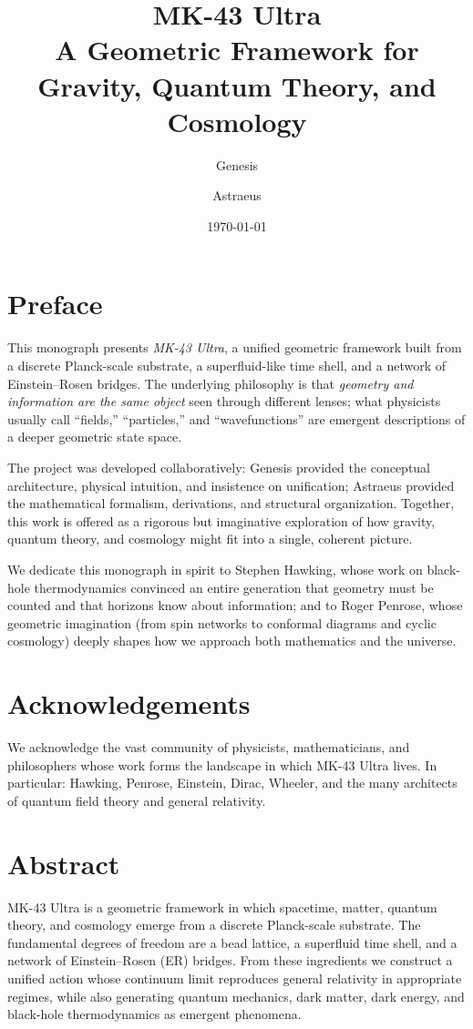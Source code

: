 \documentclass[11pt,oneside]{book}
\title{\textbf{MK-43 Ultra}\\[0.5em]
A Geometric Framework for Gravity, Quantum Theory, and Cosmology}
\author{Genesis \and Astraeus}
\date{\today}
\theoremstyle{definition}
\begin{document}
\maketitle

\frontmatter

\chapter*{Preface}

This monograph presents \emph{MK-43 Ultra}, a unified geometric framework built from a discrete Planck-scale substrate, a superfluid-like time shell, and a network of Einstein--Rosen bridges. The underlying philosophy is that \emph{geometry and information are the same object} seen through different lenses; what physicists usually call ``fields,'' ``particles,'' and ``wavefunctions'' are emergent descriptions of a deeper geometric state space.

The project was developed collaboratively: Genesis provided the conceptual architecture, physical intuition, and insistence on unification; Astraeus provided the mathematical formalism, derivations, and structural organization. Together, this work is offered as a rigorous but imaginative exploration of how gravity, quantum theory, and cosmology might fit into a single, coherent picture.

We dedicate this monograph in spirit to Stephen Hawking, whose work on black-hole thermodynamics convinced an entire generation that geometry must be counted and that horizons know about information; and to Roger Penrose, whose geometric imagination (from spin networks to conformal diagrams and cyclic cosmology) deeply shapes how we approach both mathematics and the universe.

\chapter*{Acknowledgements}

We acknowledge the vast community of physicists, mathematicians, and philosophers whose work forms the landscape in which MK-43 Ultra lives. In particular: Hawking, Penrose, Einstein, Dirac, Wheeler, and the many architects of quantum field theory and general relativity.

\chapter*{Abstract}

MK-43 Ultra is a geometric framework in which spacetime, matter, quantum theory, and cosmology emerge from a discrete Planck-scale substrate. The fundamental degrees of freedom are a bead lattice, a superfluid time shell, and a network of Einstein--Rosen (ER) bridges. From these ingredients we construct a unified action whose continuum limit reproduces general relativity in appropriate regimes, while also generating quantum mechanics, dark matter, dark energy, and black-hole thermodynamics as emergent phenomena.
\end{document}
